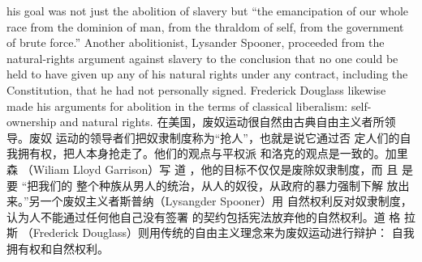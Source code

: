 \begin{paracol}{2}
his goal was not just the abolition of slavery but ``the emancipation of our whole race from the dominion of man, from the
thraldom of self, from the government of brute force.'' Another
abolitionist, Lysander Spooner, proceeded from the natural-rights argument against slavery to the conclusion that no one
could be held to have given up any of his natural rights under
any contract, including the Constitution, that he had not personally signed. Frederick Douglass likewise made his arguments for abolition in the terms of classical liberalism:
self-ownership and natural rights.
\switchcolumn
在美国，废奴运动很自然由古典自由主义者所领导。废奴
运动的领导者们把奴隶制度称为“抢人”，也就是说它通过否
定人们的自我拥有权，把人本身抢走了。他们的观点与平权派
和洛克的观点是一致的。加里森 （Wiliam  Lloyd Garrison）写
道 ，他的目标不仅仅是废除奴隶制度，而 且 是 要 “把我们的
整个种族从男人的统治，从人的奴役，从政府的暴力强制下解
放出来。”另一个废奴主义者斯普纳（Lysangder Spooner）用
自然权利反对奴隶制度，认为人不能通过任何他自己没有签署
的契约包括宪法放弃他的自然权利。道 格 拉 斯 （Frederick
Douglass）则用传统的自由主义理念来为废奴运动进行辩护：
自我拥有权和自然权利。


\end{paracol}
